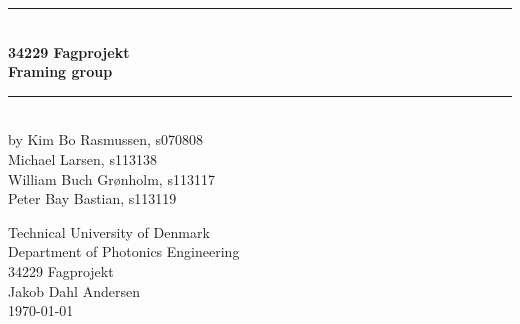\begin{titlingpage}
\centering \parindent=0pt
\newcommand{\HRule}{\rule{\textwidth}{1mm}}
 \HRule\\[1cm]\Huge\bfseries
34229 Fagprojekt\\[0.7cm]
\large Framing group\\[1cm]
\HRule\\[4cm]  
\large by Kim Bo Rasmussen, s070808\\
Michael Larsen, s113138\\
William Buch Grønholm, s113117\\
Peter Bay Bastian, s113119\\
 \normalsize %
\begin{flushleft}
Technical University of Denmark\\
Department of Photonics Engineering\\
34229 Fagprojekt\\
Jakob Dahl Andersen\\
\today \end{flushleft}
\end{titlingpage}
